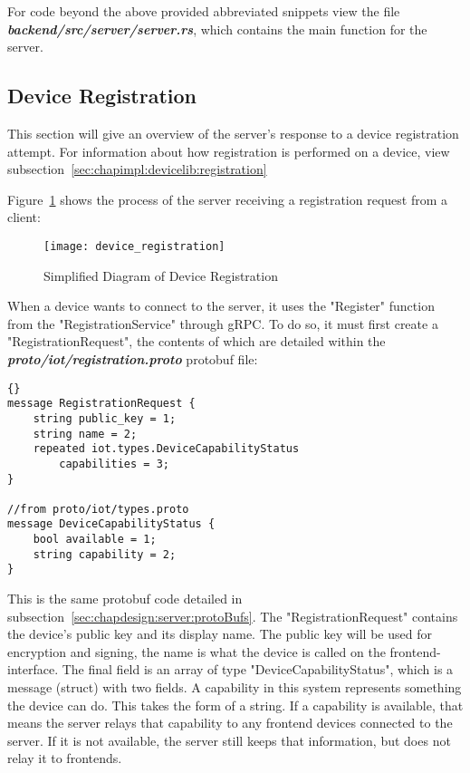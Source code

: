 For code beyond the above provided abbreviated snippets view the file \textbf{\textit{backend/src/server/server.rs}}, which contains the main function for the server.

\subsection{Device Registration} \label{sec:chapimpl:server:registration} 
This section will give an overview of the server's response to a device registration attempt. For information about how registration is performed on a device, view subsection~\ref{sec:chapimpl:devicelib:registration}

Figure~\ref{fig:server_registration} shows the process of the server receiving a registration request from a client:

\begin{figure}[h]
\caption{Simplified Diagram of Device Registration}
\texttt{[image: device\_registration]}
\label{fig:server_registration}
\end{figure}
When a device wants to connect to the server, it uses the "Register" function from the "RegistrationService" through gRPC. To do so, it must first create a "RegistrationRequest", the contents of which are detailed within the \textit{\textbf{proto/iot/registration.proto}} protobuf file:
\pagebreak
\begin{lstlisting}[language=protobuf3, style=boxed, showstringspaces=false]{}
message RegistrationRequest {
    string public_key = 1;
    string name = 2;
    repeated iot.types.DeviceCapabilityStatus 
        capabilities = 3;
}

//from proto/iot/types.proto
message DeviceCapabilityStatus {
    bool available = 1;
    string capability = 2;
}
\end{lstlisting}
This is the same protobuf code detailed in subsection~\ref{sec:chapdesign:server:protoBufs}. The "RegistrationRequest" contains the device's public key and its display name. The public key will be used for encryption and signing, the name is what the device is called on the frontend-interface. The final field is an array of type "DeviceCapabilityStatus", which is a message (struct) with two fields. A capability in this system represents something the device can do. This takes the form of a string. If a capability is available, that means the server relays that capability to any frontend devices connected to the server. If it is not available, the server still keeps that information, but does not relay it to frontends. 

